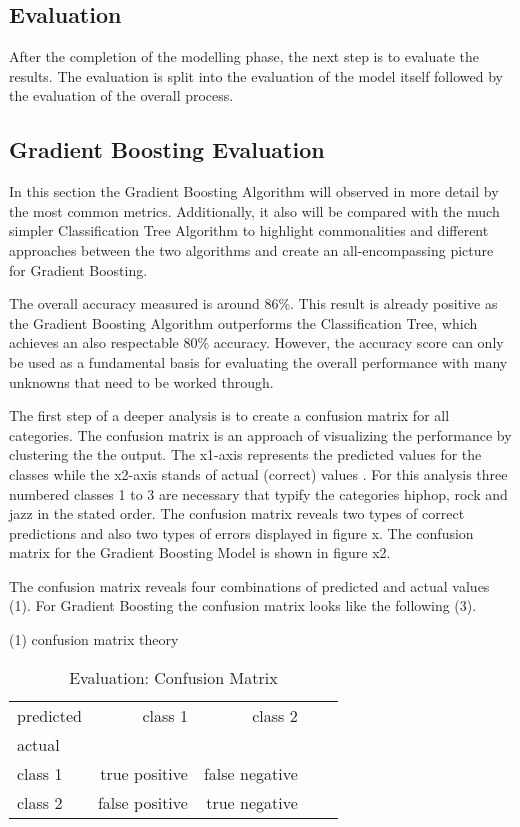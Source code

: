 \subsection{Evaluation}

After the completion of the modelling phase, the next step is to evaluate the results. The evaluation is split into 
the evaluation of the model itself followed by the evaluation of the overall process. 

\subsection{Gradient Boosting Evaluation}

In this section the Gradient Boosting Algorithm will observed in more detail by the most common metrics. Additionally, it also
will be compared with the much simpler Classification Tree Algorithm to highlight commonalities and different approaches between 
the two algorithms and create an all-encompassing picture for Gradient Boosting. 

The overall accuracy measured is around 86\%. This result is already positive as the Gradient Boosting Algorithm outperforms 
the Classification Tree, which achieves an also respectable 80\% accuracy. However, the accuracy score can only be used as a
fundamental basis for evaluating the overall performance with many unknowns that need to be worked through.

The first step of a deeper analysis is to create a confusion matrix for all categories. The confusion matrix is an approach of 
visualizing the performance by clustering the the output. The x1-axis represents the predicted values for the classes 
while the x2-axis stands of actual (correct) values \cite[p.235]{Davis_2006}. For this analysis three numbered classes 1 to 3 are necessary that 
typify the categories hiphop, rock and jazz in the stated order. The confusion matrix reveals two types of correct predictions and 
also two types of errors displayed in figure x. The confusion matrix for the Gradient Boosting Model is shown in figure x2.

The confusion matrix reveals four combinations of predicted and actual values (1). For Gradient Boosting the confusion matrix looks 
like the following (3).

(1) confusion matrix theory 

\begin{table}[H]
  \centering
  \begin{tabular}{lrrrr}
    \toprule
    predicted & class 1         &  class 2          \\
    actual    &                 &                   \\
    \midrule
    class 1   &  true positive  &  false negative   \\
    class 2   &  false positive &  true negative    \\
    \bottomrule
    \end{tabular}
  \caption{Evaluation: Confusion Matrix}%
  \label{tbl:evaluation_confusion_matrix}%
\end{table} 

